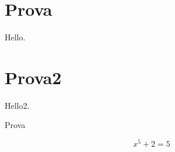 \documentclass[11pt]{article}
\begin{document}
    \section{Prova}\label{sec:prova}

    Hello.

    \section{Prova2}\label{sec:prova2}

    Hello2.

    Prova\cite{Dirac19}

    
    

    \begin{equation}
        \label{eq:equation}
        x^5 + 2 = 5
    \end{equation}
\end{document}
